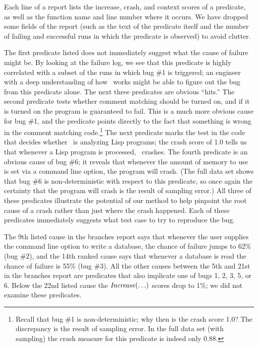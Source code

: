 Each line of a report lists the increase, crash, and context scores of
a predicate, as well as the function name and line number where it
occurs.  We have dropped some fields of the report (such as the text
of the predicate itself and the number of failing and successful runs
in which the predicate is observed) to avoid clutter.

The first predicate listed does not immediately suggest what the cause
of failure might be. By looking at the failure log, we see that this predicate
is highly correlated with a subset of the runs in which bug \#1 is
triggered; an engineer with a deep understanding of how \moss\ works
might be able to figure out the bug from this predicate alone.
The next three predicates are obvious ``hits.''  The second predicate
tests whether comment matching should be turned on, and if it is turned on the program is
guaranteed to fail. This is a much more obvious cause for bug \#1, and the predicate points directly
to the fact that something is wrong in the comment matching
code.\footnote{Recall that bug \#1 is non-deterministic; why then is
  the crash score 1.0?
The discrepancy is the result of sampling error.  In the full data set
(with  sampling) the crash measure for this predicate is indeed
only 0.88.}
The
next predicate marks the test in the code that decides whether \moss\ is analyzing Lisp
programs; the crash score of 1.0 tells us that whenever a Lisp program is
processed, \moss\ crashes.  The fourth predicate
is an obvious cause of
bug \#6; it reveals that whenever the amount of memory to use is set
via a command line option, the program will crash.  (The full data set shows that bug \#6 is non-deterministic with respect to this predicate, so once again the certainty that the program will crash is the result of sampling error.)  All three of these predicates illustrate the potential of our method to
help pinpoint the root cause of a crash rather than just where the crash
happened.  Each of these predicates immediately suggests
what test case to try to reproduce the bug.

The 9th listed cause in the branches report says that whenever the
user supplies the command line option to write a database, the chance
of failure jumps to 62\% (bug \#2), and the 14th ranked cause says
that whenever a database is read the chance of failure is 55\% (bug
\#3).  All the other causes between the 5th and 21st in the branches
report are predicates that also implicate one of bugs 1, 2, 3, 5, or
6.  Below the 22nd listed cause the $\mbox{\textit{Increase}}(\ldots)$ scores drop to
1\%; we did not examine these predicates.


